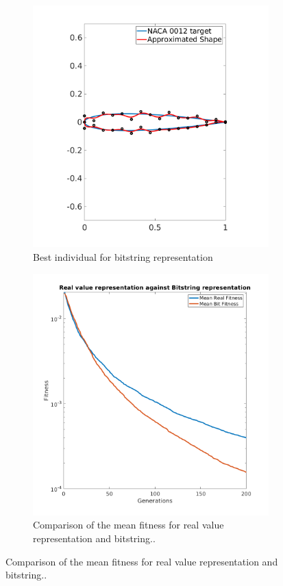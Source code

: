 \documentclass{article}
\begin{document}
\begin{itemize}
\begin{figure}[http]
\begin{subfigure}[b]{.52\linewidth}
		\end{subfigure}
		\hspace{1mm}
		\begin{subfigure}[b]{.45\linewidth}
			\includegraphics[scale=0.3]{img/Best_bit_GA_20_20000.png}
			\caption{Best individual for bitstring representation}\label{fig:tiger}
		\end{subfigure}
		
		\begin{subfigure}[b]{.45\linewidth}
			\includegraphics[scale = 0.3]{img/GA_real_vs_bit.png}
			\caption{Comparison of the mean fitness for real value representation and bitstring.. \label{fig:xxx1}}
			

\end{subfigure}
\end{figure}
\end{itemize}
\end{document}
